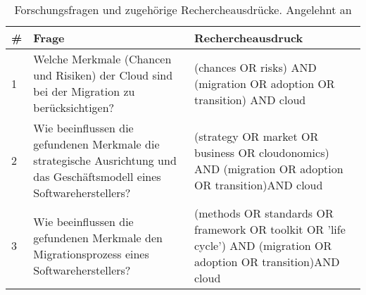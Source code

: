 %
%
\begin{table}[h]
\centering
\begin{tabular}{|l|p{}|p{}|}
	\hline
	\textbf{\#} & \textbf{Frage} & \textbf{Rechercheausdruck} \\
	\hline
	1 & Welche Merkmale (Chancen und Risiken) der Cloud sind bei der 
Migration zu berücksichtigen? & 
(chances OR risks) \newline
AND \newline
(migration OR adoption OR transition) \newline
AND \newline
cloud
\\
	\hline
	2 & Wie beeinflussen die gefundenen Merkmale die strategische 
Ausrichtung und das Geschäftsmodell eines Softwareherstellers? & 
(strategy OR market OR business OR cloudonomics) \newline 
AND\newline 
(migration OR adoption OR transition)\newline AND\newline
cloud\\
	\hline
	3 & Wie beeinflussen die gefundenen Merkmale den Migrationsprozess 
eines Softwareherstellers? & (methods 
OR 
standards OR framework OR toolkit OR 'life cycle') \newline AND\newline 
(migration OR adoption OR transition)\newline AND\newline
cloud\\	
	\hline

\end{tabular}
\caption{Forschungsfragen und zugehörige Rechercheausdrücke. Angelehnt 
an \cite{exploring_the_factors}}
\label{tab:searchstrings}
\end{table}
\begin{comment}
	\hline
	1 & In welche Aufgaben lässt sich die Migration 
einer On-Premise-Software zu Salesforce unterteilen? & (tasks OR 
needs OR requirements)\newline AND\newline (migration OR adoption)\newline 
AND\newline salesforce
\\
	\hline
	2 & Welche Methoden unterstützen diesen Migrationsprozess? & (methods 
OR 
standards OR framework) \newline AND\newline 
('cloud migration' OR 'cloud adaption' OR 'salesforce') \\
	\hline
	3 & Wie unterstützt Salesforce die Migration technisch? & (tools OR 
interfaces OR api)\newline AND\newline (migration OR 
adoption)\newline 
AND\newline salesforce\\
	\hline
\end{comment}
